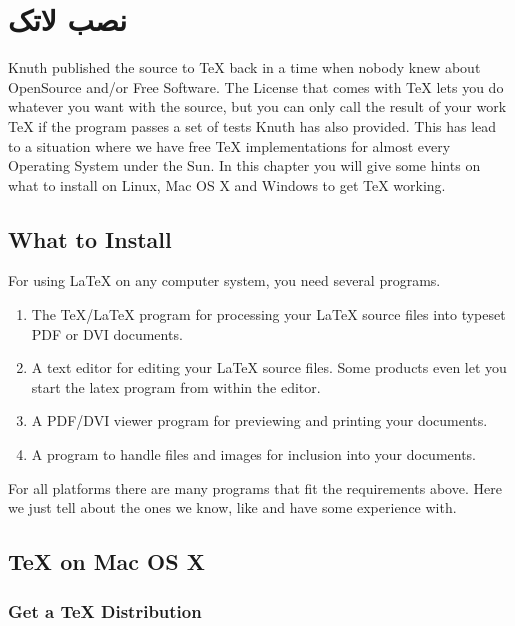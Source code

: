 \appendix
\chapter{نصب لاتک}
\begin{intro}
Knuth published the source to \TeX{} back in a time when nobody knew
about OpenSource and/or Free Software. The License that comes with \TeX{}
lets you do whatever you want with the source, but you can only call the
result of your work \TeX{} if the program passes a set of tests Knuth has
also provided. This has lead to a situation where we have free \TeX{}
implementations for almost every Operating System under the Sun. In this chapter
you will give some hints on what to install on Linux, Mac OS X and Windows to
get \TeX{} working.
\end{intro}

\section{What to Install}

For using LaTeX on any computer system, you need several programs.

\begin{enumerate}

\item The \TeX{}/\LaTeX{} program for processing your \LaTeX{} source files
into typeset PDF or DVI documents.

\item A text editor for editing your LaTeX source files. Some products even let
you start the latex program from within the editor.

\item A PDF/DVI viewer program for previewing and printing your
documents.

\item A program to handle \PSi{} files and images for inclusion into
your documents.

\end{enumerate}

For all platforms there are many programs that fit the requirements above.
Here we just tell about the ones we know, like and have some experience
with.

\section{\TeX{} on Mac OS X}

\subsection{Get a \TeX{} Distribution}

